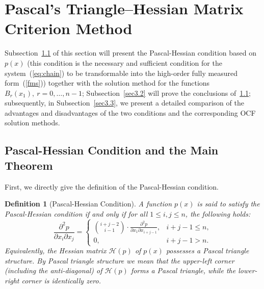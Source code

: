 \documentclass[11pt]{article}
\newtheorem{definition}{Definition}
\begin{document}
\section{Pascal's Triangle--Hessian Matrix Criterion Method}\label{sec3}

Subsection~\ref{sec3.1} of this section will present the Pascal-Hessian condition based on $p(x)$ (this condition is the necessary and sufficient condition for the system~(\ref{eq:chain}) to be transformable into the high-order fully measured form~(\ref{fms})) together with the solution method for the functions $B_r(x_1),~r=0,\ldots,n-1$; Subsection~\ref{sec3.2} will prove the conclusions of~\ref{sec3.1}; subsequently, in Subsection~\ref{sec3.3}, we present a detailed comparison of the advantages and disadvantages of the two conditions and the corresponding OCF solution methods.

\subsection{Pascal-Hessian Condition and the Main Theorem}\label{sec3.1}

First, we directly give the definition of the Pascal-Hessian condition.
\begin{definition}[Pascal-Hessian Condition]\label{def:PH}
	A function $p(x)$ is said to satisfy the Pascal-Hessian condition if and only if for all $1 \leq i, j \leq n$, the following holds:
	\begin{equation}\label{eq:PH}
		\frac{\partial^2 p}{\partial x_i \partial x_j} =
		\begin{cases}
			\displaystyle \binom{i+j-2}{i-1} \cdot \frac{\partial^2 p}{\partial x_1 \partial x_{i+j-1}}, & i+j-1 \leq n, \\[1.5em]
			0, & i+j-1 > n.
		\end{cases}
	\end{equation}
	Equivalently, the Hessian matrix $\mathcal{H}(p)$ of $p(x)$ possesses a Pascal triangle structure. By Pascal triangle structure we mean that the upper-left corner (including the anti-diagonal) of $\mathcal{H}(p)$ forms a Pascal triangle, while the lower-right corner is identically zero.
\end{definition}
\end{document}
